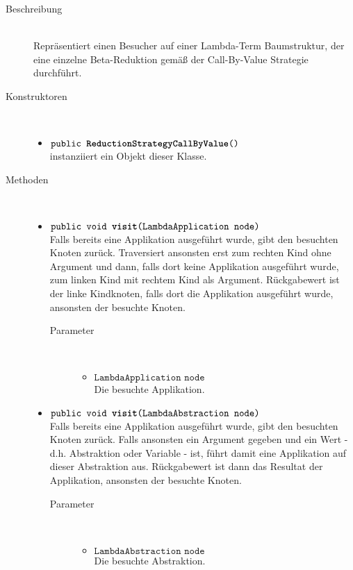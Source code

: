 \begin{description}
\item[Beschreibung] \hfill \\ Repräsentiert einen Besucher auf einer Lambda-Term Baumstruktur, der eine einzelne Beta-Reduktion gemäß der Call-By-Value Strategie durchführt.

\item[Konstruktoren] \hfill \\
	\vspace{-.8cm}
	\begin{itemize}
		\item $\texttt{public \textbf{ReductionStrategyCallByValue}()}$ \\ instanziiert ein Objekt dieser Klasse.
	\end{itemize}

\item[Methoden] \hfill \\
	\vspace{-.8cm}
	\begin{itemize}
		\item $\texttt{public void \textbf{visit}(LambdaApplication node)}$ \\ Falls bereits eine Applikation ausgeführt wurde, gibt den besuchten Knoten zurück. Traversiert ansonsten erst zum rechten Kind ohne Argument und dann, falls dort keine Applikation ausgeführt wurde, zum linken Kind mit rechtem Kind als Argument. Rückgabewert ist der linke Kindknoten, falls dort die Applikation ausgeführt wurde, ansonsten der besuchte Knoten.
		\begin{description}
			\item[Parameter] \hfill \\
			\vspace{-.8cm}
			\begin{itemize}
				\item $\texttt{LambdaApplication node}$ \\ Die besuchte Applikation.
			\end{itemize}
		\end{description}
		
		\item $\texttt{public void \textbf{visit}(LambdaAbstraction node)}$ \\ Falls bereits eine Applikation ausgeführt wurde, gibt den besuchten Knoten zurück. Falls ansonsten ein Argument gegeben und ein Wert - d.h. Abstraktion oder Variable - ist, führt damit eine Applikation auf dieser Abstraktion aus. Rückgabewert ist dann das Resultat der Applikation, ansonsten der besuchte Knoten.
		\begin{description}
			\item[Parameter] \hfill \\
			\vspace{-.8cm}
			\begin{itemize}
				\item $\texttt{LambdaAbstraction node}$ \\ Die besuchte Abstraktion.
			\end{itemize}
		\end{description}
	\end{itemize}
\end{description}

